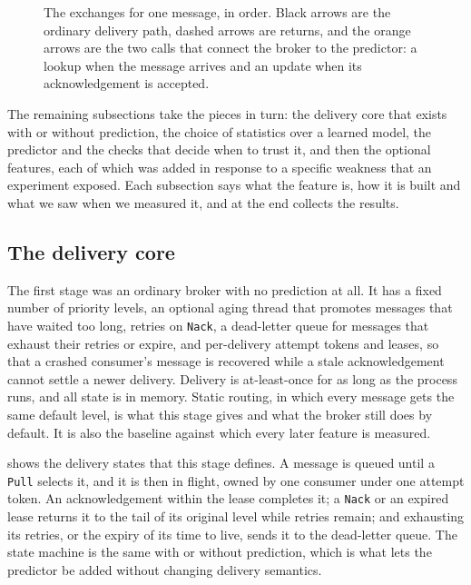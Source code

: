 \begin{figure}[t]
  \centering
  
  \caption{The exchanges for one message, in order. Black arrows are the ordinary delivery path, dashed arrows are returns, and the orange
  arrows are the two calls that connect the broker to the predictor: a lookup when the message arrives and an update when its
  acknowledgement is accepted.}
  \label{fig:sequence}
\end{figure}

The remaining subsections take the pieces in turn: the delivery core that exists with or without prediction, the choice of statistics over a
learned model, the predictor and the checks that decide when to trust it, and then the optional features, each of which was added in response to a specific
weakness that an experiment exposed. Each subsection says what the feature is, how it is built and what we saw when we measured it, and
 at the end collects the results.

\subsection{The delivery core}\label{sec:core}

The first stage was an ordinary broker with no prediction at all. It has a fixed number of priority levels, an optional aging thread that promotes messages that
have waited too long, retries on \texttt{Nack}, a dead-letter queue for messages that exhaust their retries or expire, and per-delivery attempt tokens and leases, so that a
crashed consumer's message is recovered while a stale acknowledgement cannot settle a newer delivery. Delivery is at-least-once for as long as the process
runs, and all state is in memory. Static routing, in which every message gets the same default level, is what this stage gives and what the broker still does by
default. It is also the baseline against which every later feature is measured.

 shows the delivery states that this stage defines. A message is queued until a \texttt{Pull} selects it, and it is then in
flight, owned by one consumer under one attempt token. An acknowledgement within the lease completes it; a \texttt{Nack} or an expired lease
returns it to the tail of its original level while retries remain; and exhausting its retries, or the expiry of its time to live, sends it to the dead-letter
queue. The state machine is the same with or without prediction, which is what lets the predictor be added without changing delivery semantics.

